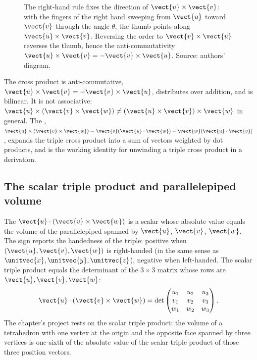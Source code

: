 \begin{figure}[h]
  \centering
  
  \caption[The right-hand rule for the cross product.]{The right-hand
  rule fixes the direction of $\vect{u}\times\vect{v}$: with the
  fingers of the right hand sweeping from $\vect{u}$ toward $\vect{v}$
  through the angle $\theta$, the thumb points along
  $\vect{u}\times\vect{v}$. Reversing the order to
  $\vect{v}\times\vect{u}$ reverses the thumb, hence the
  anti-commutativity $\vect{u}\times\vect{v} = -\vect{v}\times\vect{u}$.
  Source: authors' diagram.}
  \label{fig:vol02:ch08:right-hand-rule}
\end{figure}

The cross product is anti-commutative, $\vect{u} \times \vect{v} =
-\vect{v} \times \vect{u}$, distributes over addition, and is bilinear.
It is not associative: $\vect{u} \times (\vect{v} \times \vect{w})
\neq (\vect{u} \times \vect{v}) \times \vect{w}$ in general. The
, $\vect{u} \times (\vect{v} \times \vect{w}) =
\vect{v}(\vect{u} \cdot \vect{w}) - \vect{w}(\vect{u} \cdot \vect{v})$,
expands the triple cross product into a sum of vectors weighted by
dot products, and is the working identity for unwinding a triple
cross product in a derivation.

\subsection{The scalar triple product and parallelepiped volume}

The  $\vect{u} \cdot (\vect{v} \times
\vect{w})$ is a scalar whose absolute value equals the volume of the
parallelepiped spanned by $\vect{u}$, $\vect{v}$, $\vect{w}$. The
sign reports the handedness of the triple: positive when
$(\vect{u}, \vect{v}, \vect{w})$ is right-handed (in the same sense
as $\unitvec{x}, \unitvec{y}, \unitvec{z}$), negative when
left-handed. The scalar triple product equals the determinant of the
$3 \times 3$ matrix whose rows are $\vect{u}, \vect{v}, \vect{w}$:
\[
\vect{u} \cdot (\vect{v} \times \vect{w}) = \det
\begin{pmatrix}
u_{1} & u_{2} & u_{3} \\
v_{1} & v_{2} & v_{3} \\
w_{1} & w_{2} & w_{3}
\end{pmatrix}.
\]
The chapter's project rests on the scalar triple product: the
volume of a tetrahedron with one vertex at the origin and the
opposite face spanned by three vertices is one-sixth of the absolute
value of the scalar triple product of those three position vectors.


